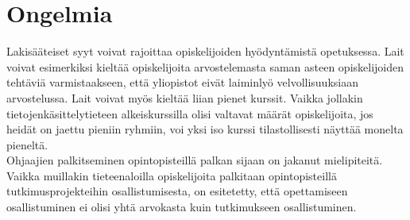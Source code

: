 \documentclass[finnish]{tktltiki2}
\theoremstyle{definition}
\theoremstyle{remark}
\begin{document}
\section{Ongelmia}
Lakisääteiset syyt voivat rajoittaa opiskelijoiden hyödyntämistä opetuksessa. Lait voivat esimerkiksi kieltää opiskelijoita arvostelemasta saman asteen opiskelijoiden tehtäviä varmistaakseen, että yliopistot eivät laiminlyö velvollisuuksiaan arvostelussa. Lait voivat myös kieltää liian pienet kurssit. Vaikka jollakin tietojenkäsittelytieteen alkeiskurssilla olisi valtavat määrät opiskelijoita, jos heidät on jaettu pieniin ryhmiin, voi yksi iso kurssi tilastollisesti näyttää monelta pieneltä.\cite{Reges03}
\\
Ohjaajien palkitseminen opintopisteillä palkan sijaan on jakanut mielipiteitä. Vaikka muillakin tieteenaloilla opiskelijoita palkitaan opintopisteillä tutkimusprojekteihin osallistumisesta, on esitetetty, että opettamiseen osallistuminen ei olisi yhtä arvokasta kuin tutkimukseen osallistuminen.\cite{Reges88}



\end{document}
